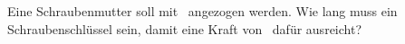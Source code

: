 Eine Schraubenmutter soll mit \MSlO\ angezogen werden. Wie lang muss ein Schraubenschlüssel sein, damit eine Kraft von \FSlO\ dafür ausreicht?
